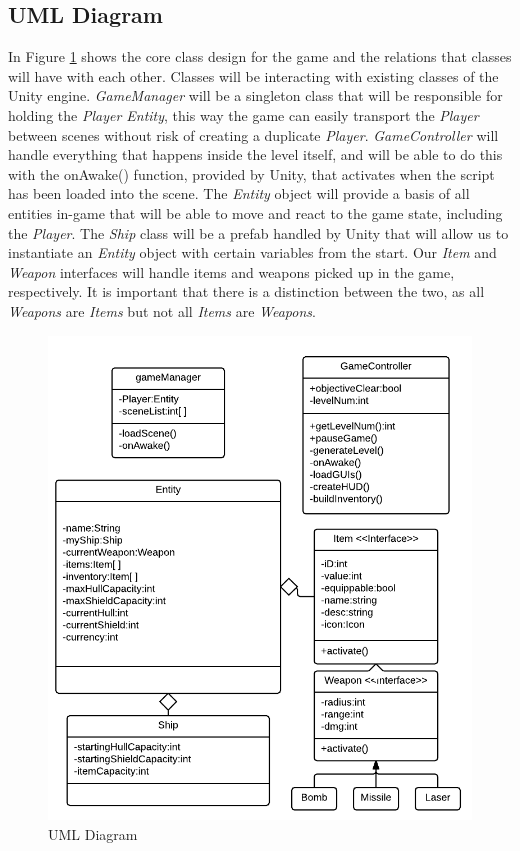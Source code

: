 \documentclass[12pt]{article}       %
\def\hs{\hspace{15pt}}
\begin{document}
\subsection{UML Diagram}
\hs In Figure \ref{UML} shows the core class design for the game and the relations that classes will have with each other. Classes will be interacting with existing classes of the Unity engine. {\it GameManager} will be a singleton class that will be responsible for holding the {\it Player Entity}, this way the game can easily transport the {\it Player} between scenes without risk of creating a duplicate {\it Player}. {\it GameController} will handle everything that happens inside the level itself, and will be able to do this with the onAwake() function, provided by Unity, that activates when the script has been loaded into the scene. The {\it Entity} object will provide a basis of all entities in-game that will be able to move and react to the game state, including the {\it Player}. The {\it Ship} class will be a prefab handled by Unity that will allow us to instantiate an {\it Entity} object with certain variables from the start. Our {\it Item} and {\it Weapon} interfaces will handle items and weapons picked up in the game, respectively. It is important that there is a distinction between the two, as all {\it Weapons} are {\it Items} but not all {\it Items} are {\it Weapons}.

\begin{figure} [H]
\centering
\includegraphics[width=4.5in]{ClassDiagram.png}
\caption{UML Diagram} \label{UML}
\end{figure}
\end{document}
